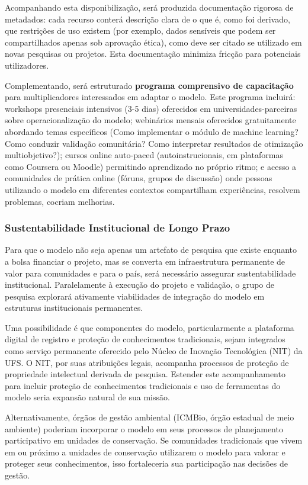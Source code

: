 Acompanhando esta disponibilização, será produzida documentação rigorosa de metadados: cada recurso conterá descrição clara de o que é, como foi derivado, que restrições de uso existem (por exemplo, dados sensíveis que podem ser compartilhados apenas sob aprovação ética), como deve ser citado se utilizado em novas pesquisas ou projetos. Esta documentação minimiza fricção para potenciais utilizadores.

Complementando, será estruturado \textbf{programa comprensivo de capacitação} para multiplicadores interessados em adaptar o modelo. Este programa incluirá: workshops presenciais intensivos (3-5 dias) oferecidos em universidades-parceiras sobre operacionalização do modelo; webinários mensais oferecidos gratuitamente abordando temas específicos (Como implementar o módulo de machine learning? Como conduzir validação comunitária? Como interpretar resultados de otimização multiobjetivo?); cursos online auto-paced (autoinstrucionais, em plataformas como Coursera ou Moodle) permitindo aprendizado no próprio ritmo; e acesso a comunidades de prática online (fóruns, grupos de discussão) onde pessoas utilizando o modelo em diferentes contextos compartilham experiências, resolvem problemas, cocriam melhorias.

\subsubsection{Sustentabilidade Institucional de Longo Prazo}

Para que o modelo não seja apenas um artefato de pesquisa que existe enquanto a bolsa financiar o projeto, mas se converta em infraestrutura permanente de valor para comunidades e para o país, será necessário assegurar sustentabilidade institucional. Paralelamente à execução do projeto e validação, o grupo de pesquisa explorará ativamente viabilidades de integração do modelo em estruturas institucionais permanentes.

Uma possibilidade é que componentes do modelo, particularmente a plataforma digital de registro e proteção de conhecimentos tradicionais, sejam integrados como serviço permanente oferecido pelo Núcleo de Inovação Tecnológica (NIT) da UFS. O NIT, por suas atribuições legais, acompanha processos de proteção de propriedade intelectual derivada de pesquisa. Estender este acompanhamento para incluir proteção de conhecimentos tradicionais e uso de ferramentas do modelo seria expansão natural de sua missão.

Alternativamente, órgãos de gestão ambiental (ICMBio, órgão estadual de meio ambiente) poderiam incorporar o modelo em seus processos de planejamento participativo em unidades de conservação. Se comunidades tradicionais que vivem em ou próximo a unidades de conservação utilizarem o modelo para valorar e proteger seus conhecimentos, isso fortaleceria sua participação nas decisões de gestão.

